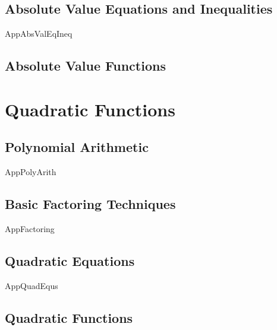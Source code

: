 \section{Absolute Value Equations and Inequalities}

{AppAbsValEqIneq}

\newpage

\section{Absolute Value Functions}



\newpage

\chapter{Quadratic Functions}

\section{Polynomial Arithmetic}

{AppPolyArith}

\newpage

\section{Basic Factoring Techniques}

{AppFactoring}

\newpage

\section{Quadratic Equations}

{AppQuadEqus}

\newpage

\section{Quadratic Functions}


\newpage
